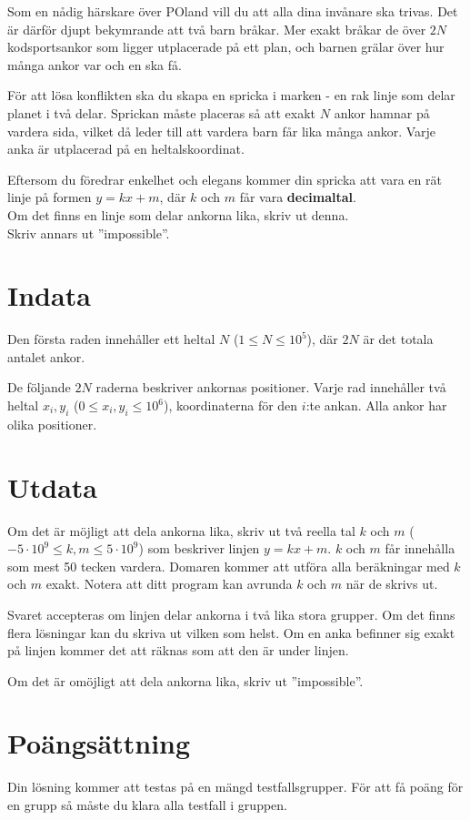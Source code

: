 \noindent

Som en nådig härskare över POland vill du att alla dina invånare ska trivas. Det är därför djupt bekymrande
att två barn bråkar. Mer exakt bråkar de över $2N$ kodsportsankor som ligger
utplacerade på ett plan, och barnen grälar över hur många ankor var och en ska få.

För att lösa konflikten ska du skapa en spricka i marken - en rak linje som delar planet i två delar.
Sprickan måste placeras så att exakt $N$ ankor hamnar på vardera sida, vilket då leder till att vardera barn
får lika många ankor. Varje anka är utplacerad på en heltalskoordinat.

Eftersom du föredrar enkelhet och elegans kommer din spricka att vara en rät linje på formen $y=kx+m$,
där $k$ och $m$ får vara \textbf{decimaltal}. \\
Om det finns en linje som delar ankorna lika, skriv ut denna.\\ 
Skriv annars ut ''impossible''.

\section*{Indata}
Den första raden innehåller ett heltal $N$ ($1 \leq N \leq 10^5$), där $2N$ är det totala antalet ankor.

De följande $2N$ raderna beskriver ankornas positioner.
Varje rad innehåller två heltal $x_i, y_i$ ($0 \leq x_i, y_i \leq 10^6$), koordinaterna för den $i$:te ankan.
Alla ankor har olika positioner.

\section*{Utdata}
Om det är möjligt att dela ankorna lika, skriv ut två reella tal $k$ och $m$
($-5 \cdot 10^9 \leq k, m \leq 5 \cdot 10^9$) som beskriver linjen $y = kx + m$.
$k$ och $m$ får innehålla som mest 50 tecken vardera. Domaren kommer att utföra alla beräkningar med $k$ och $m$ exakt.
Notera att ditt program kan avrunda $k$ och $m$ när de skrivs ut. 

Svaret accepteras om linjen delar ankorna i två lika stora grupper. Om det finns flera lösningar kan du skriva ut
vilken som helst. Om en anka befinner sig exakt på linjen kommer det att räknas som att den är under linjen. 

Om det är omöjligt att dela ankorna lika, skriv ut ''impossible''.

\section*{Poängsättning}
Din lösning kommer att testas på en mängd testfallsgrupper.
För att få poäng för en grupp så måste du klara alla testfall i gruppen.

